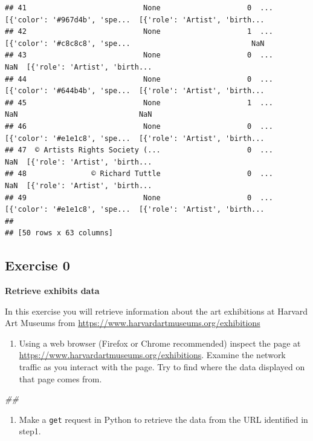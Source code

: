 \documentclass[
]{book}
\newenvironment{Shaded}{\begin{snugshade}}{\end{snugshade}}
\newcommand{\CommentTok}[1]{\textcolor[rgb]{0.56,0.35,0.01}{\textit{#1}}}
\providecommand{\tightlist}{%
  \setlength{\itemsep}{0pt}\setlength{\parskip}{0pt}}
\begin{document}
\begin{verbatim}
## 41                           None                    0  ...  [{'color': '#967d4b', 'spe...  [{'role': 'Artist', 'birth...
## 42                           None                    1  ...  [{'color': '#c8c8c8', 'spe...                            NaN
## 43                           None                    0  ...                            NaN  [{'role': 'Artist', 'birth...
## 44                           None                    0  ...  [{'color': '#644b4b', 'spe...  [{'role': 'Artist', 'birth...
## 45                           None                    1  ...                            NaN                            NaN
## 46                           None                    0  ...  [{'color': '#e1e1c8', 'spe...  [{'role': 'Artist', 'birth...
## 47  © Artists Rights Society (...                    0  ...                            NaN  [{'role': 'Artist', 'birth...
## 48               © Richard Tuttle                    0  ...                            NaN  [{'role': 'Artist', 'birth...
## 49                           None                    0  ...  [{'color': '#e1e1c8', 'spe...  [{'role': 'Artist', 'birth...
## 
## [50 rows x 63 columns]
\end{verbatim}

\hypertarget{exercise-0-4}{%
\subsection{Exercise 0}\label{exercise-0-4}}

\textbf{Retrieve exhibits data}

In this exercise you will retrieve information about the art exhibitions at Harvard Art Museums from \url{https://www.harvardartmuseums.org/exhibitions}

\begin{enumerate}
\def\labelenumi{\arabic{enumi}.}
\tightlist
\item
  Using a web browser (Firefox or Chrome recommended) inspect the
  page at \url{https://www.harvardartmuseums.org/exhibitions}. Examine
  the network traffic as you interact with the page. Try to find
  where the data displayed on that page comes from.
\end{enumerate}

\begin{Shaded}
\begin{Highlighting}[]
\CommentTok{\#\#}
\end{Highlighting}
\end{Shaded}

\begin{enumerate}
\def\labelenumi{\arabic{enumi}.}
\setcounter{enumi}{1}
\tightlist
\item
  Make a \texttt{get} request in Python to retrieve the data from the URL
  identified in step1.
\end{enumerate}
\end{document}
